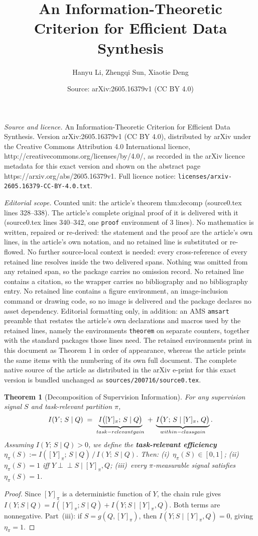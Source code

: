 \documentclass[10pt,a4paper]{amsart}
\title{An Information-Theoretic Criterion for Efficient Data Synthesis}
\author{Hanyu Li, Zhengqi Sun, Xiaotie Deng}
\date{Source: arXiv:2605.16379v1 (CC BY 4.0)}
\newtheorem{theorem}{Theorem}
\begin{document}
\maketitle

\noindent\emph{Source and licence.} An Information-Theoretic Criterion for Efficient Data Synthesis. Version arXiv:2605.16379v1 (CC BY 4.0), distributed by arXiv under the Creative Commons Attribution 4.0 International licence, http://creativecommons.org/licenses/by/4.0/, as recorded in the arXiv licence metadata for this exact version and shown on the abstract page https://arxiv.org/abs/2605.16379v1. Full licence notice: \texttt{licenses/arxiv-2605.16379-CC-BY-4.0.txt}.\par\smallskip

\noindent\textit{Editorial scope.} Counted unit: the article's theorem thm:decomp (source0.tex lines 328--338). The article's complete original proof of it is delivered with it (source0.tex lines 340--342, one \texttt{proof} environment of 3 lines). No mathematics is written, repaired or re-derived: the statement and the proof are the article's own lines, in the article's own notation, and no retained line is substituted or re-flowed.  No further source-local context is needed: every cross-reference of every retained line resolves inside the two delivered spans.  Nothing was omitted from any retained span, so the package carries no omission record.  No retained line contains a citation, so the wrapper carries no bibliography and no bibliography entry.  No retained line contains a figure environment, an image-inclusion command or drawing code, so no image is delivered and the package declares no asset dependency.  Editorial formatting only, in addition: an AMS \texttt{amsart} preamble that restates the article's own declarations and macros used by the retained lines, namely the environments \texttt{theorem} on separate counters, together with the standard packages those lines need.  The retained environments print in this document as Theorem 1 in order of appearance, whereas the article prints the same items with the numbering of its own full document.  The complete native source of the article as distributed in the arXiv e-print for this exact version is bundled unchanged as \texttt{sources/200716/source0.tex}.
\begin{theorem}[Decomposition of Supervision Information]
\label{thm:decomp}
For any supervision signal $S$ and task-relevant partition $\pi$,
\begin{equation}
\label{eq:decomp}
  I(Y;\,S\mid Q)
  \;=\;\underbrace{I\bigl([Y]_\pi;\,S\mid Q\bigr)}_{\textup{task-relevant gain}}
  \;+\;\underbrace{I\bigl(Y;\,S\mid [Y]_\pi,\,Q\bigr)}_{\textup{within-class gain}}.
\end{equation}
Assuming $I(Y;\,S\mid Q)>0$, we define the \textbf{task-relevant efficiency} $\eta_\pi(S):= I([Y]_\pi;\,S\mid Q)\,/\,I(Y;\,S\mid Q)$. Then: \textup{(i)}~$\eta_\pi(S)\in[0,1]$; \textup{(ii)}~$\eta_\pi(S)=1$ iff $Y\perp\!\!\!\perp S\mid [Y]_\pi,Q$; \textup{(iii)}~every $\pi$-measurable signal satisfies $\eta_\pi(S)=1$.
\end{theorem}

\begin{proof}
Since $[Y]_\pi$ is a deterministic function of $Y$, the chain rule gives $I(Y;S\mid Q)=I([Y]_\pi;S\mid Q)+I(Y;S\mid [Y]_\pi,Q)$. Both terms are nonneg\-ative. Part~(iii): if $S=g(Q,[Y]_\pi)$, then $I(Y;S\mid [Y]_\pi,Q)=0$, giving $\eta_\pi=1$.
\end{proof}
\end{document}
